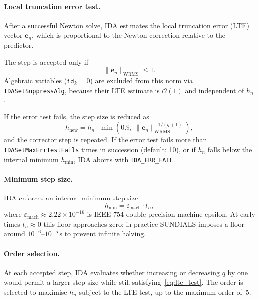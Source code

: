 \begin{refsection}
\paragraph{Local truncation error test.} After a successful Newton solve, IDA estimates the local truncation error (LTE) vector $\mathbf{e}_n$, which is proportional to the Newton correction relative to the predictor.

The step is accepted only if
\begin{equation}
  \|\mathbf{e}_n\|_\mathrm{WRMS} \leq 1.
  \label{eq:lte_test}
\end{equation}
Algebraic variables ($\mathtt{id}_k = 0$) are excluded from this norm via \texttt{IDASetSuppressAlg}, because their LTE estimate is $\mathcal{O}(1)$ and independent of $h_n$.

If the error test fails, the step size is reduced as
\begin{equation}
  h_\mathrm{new} = h_n \cdot \min\!\left(0.9,\;
    \|\mathbf{e}_n\|_\mathrm{WRMS}^{-1/(q+1)}\right),
  \label{eq:hreduce}
\end{equation}
and the corrector step is repeated.  If the error test fails more than \texttt{IDASetMaxErrTestFails} times in succession (default: 10), or if $h_n$ falls below the internal minimum $h_\mathrm{min}$, IDA aborts with \texttt{IDA\_ERR\_FAIL}.

\paragraph{Minimum step size.} IDA enforces an internal minimum step size
\begin{equation}
  h_\mathrm{min} = \varepsilon_\mathrm{mach} \cdot t_n,
  \label{eq:hmin}
\end{equation}
where $\varepsilon_\mathrm{mach} \approx 2.22 \times 10^{-16}$ is IEEE-754 double-precision machine epsilon. At early times $t_n \approx 0$ this floor approaches zero; in practice SUNDIALS imposes a floor around $10^{-6}$--$10^{-5}$\,s to prevent infinite halving.

\paragraph{Order selection.} At each accepted step, IDA evaluates whether increasing or decreasing $q$ by one would permit a larger step size while still satisfying~\eqref{eq:lte_test}.  The order is selected to maximise $h_n$ subject to the LTE test, up to the maximum order of~5.


\end{refsection}
